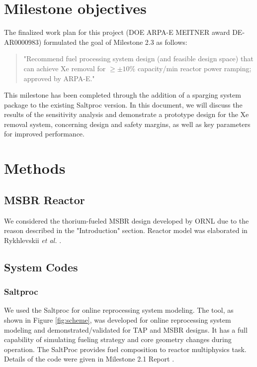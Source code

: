 \section{Milestone objectives}

    The finalized work plan for this project (DOE ARPA-E MEITNER award 
    DE-AR0000983) formulated the goal of Milestone 2.3 as follows:

    \begin{quotation}
        "Recommend fuel processing system design (and feasible design
        space) that can achieve Xe removal for $\ge \pm 10\%$ capacity/min 
            reactor power ramping; approved by ARPA-E."
    \end{quotation}

    This milestone has been completed through the addition of a sparging system 
    package to the existing Saltproc version. In this document, we will discuss 
    the results of the sensitivity analysis and demonstrate a prototype design 
    for the Xe removal system, concerning design and safety margins, as well as 
    key parameters for improved performance.

\section{Methods}

\subsection{MSBR Reactor}

    We considered the thorium-fueled MSBR design 
    \cite{robertson_conceptual_1971} developed by ORNL due to the reason 
    described in the "Introduction" section. Reactor model was elaborated in 
    Rykhlevskii \emph{et al.} \cite{rykhlevskii_modeling_2019}.

\subsection{System Codes}

\subsubsection{Saltproc}

    We used the Saltproc \cite{rykhlevskii_saltproc_2018} for online 
    reprocessing system modeling. The tool, as shown in Figure 
    \ref{fig:scheme}, was developed for online reprocessing system modeling and 
    demonstrated/validated for TAP and MSBR designs. It has a full capability 
    of simulating fueling strategy and core geometry changes during operation. 
    The SaltProc provides fuel composition to reactor multiphysics task. 
    Details of the code were given in Milestone 2.1 Report 
    \cite{rykhlevskii_milestone_2019}.

